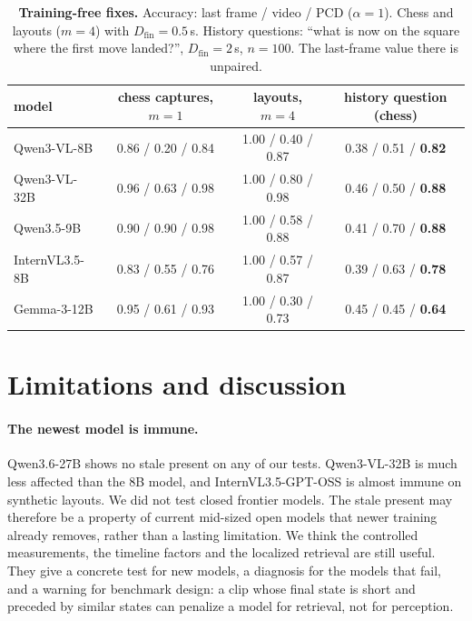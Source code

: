 \documentclass[10pt,twocolumn,letterpaper]{article}
\begin{document}
\begin{table}[t]
  \centering
  \small
  \caption{\textbf{Training-free fixes.} Accuracy: last frame / video / PCD ($\alpha=1$). Chess and layouts ($m=4$) with $D_\text{fin}=0.5$\,s. History questions: ``what is now on the square where the first move landed?'', $D_\text{fin}=2$\,s, $n=100$. The last-frame value there is unpaired.}
  \label{tab:fix}
  \begin{tabular}{lccc}
    \toprule
    model & chess captures, $m=1$ & layouts, $m=4$ & history question (chess) \\
    \midrule
    Qwen3-VL-8B & 0.86 / 0.20 / 0.84 & 1.00 / 0.40 / 0.87 & 0.38 / 0.51 / \textbf{0.82} \\
    Qwen3-VL-32B & 0.96 / 0.63 / 0.98 & 1.00 / 0.80 / 0.98 & 0.46 / 0.50 / \textbf{0.88} \\
    Qwen3.5-9B & 0.90 / 0.90 / 0.98 & 1.00 / 0.58 / 0.88 & 0.41 / 0.70 / \textbf{0.88} \\
    InternVL3.5-8B & 0.83 / 0.55 / 0.76 & 1.00 / 0.57 / 0.87 & 0.39 / 0.63 / \textbf{0.78} \\
    Gemma-3-12B & 0.95 / 0.61 / 0.93 & 1.00 / 0.30 / 0.73 & 0.45 / 0.45 / \textbf{0.64} \\
    \bottomrule
  \end{tabular}
\end{table}

\section{Limitations and discussion}
\label{sec:limits}

\paragraph{The newest model is immune.} Qwen3.6-27B shows no stale present on any of our tests. Qwen3-VL-32B is much less affected than the 8B model, and InternVL3.5-GPT-OSS is almost immune on synthetic layouts. We did not test closed frontier models. The stale present may therefore be a property of current mid-sized open models that newer training already removes, rather than a lasting limitation. We think the controlled measurements, the timeline factors and the localized retrieval are still useful. They give a concrete test for new models, a diagnosis for the models that fail, and a warning for benchmark design: a clip whose final state is short and preceded by similar states can penalize a model for retrieval, not for perception.
\end{document}

